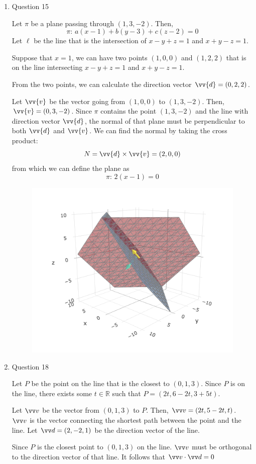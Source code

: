 \documentclass[11pt]{article}
\def\R {{\mathbb R}}
\begin{document}
\begin{enumerate}
    \newpage
    
    \item Question 15
    
    Let $\pi$ be a plane passing through $(1,3,-2)$. Then,
    $$
    \pi:\, a(x-1)+b(y-3)+c(z-2) = 0
    $$
    Let $\ell$ be the line that is the intersection of $x-y+z=1$ and $x+y-z=1$.
    
    Suppose that $x=1$, we can have two points $(1,0,0)$ and $(1,2,2)$ that is on the line intersecting $x-y+z=1$ and $x+y-z=1$.
    
    From the two points, we can calculate the direction vector $\vv{d} = (0,2,2)$.
    
    Let $\vv{v}$ be the vector going from $(1,0,0)$ to $(1,3,-2)$. Then, $\vv{v}=(0,3,-2)$. Since $\pi$ contains the point $(1,3,-2)$ and the line with direction vector $\vv{d}$, the normal of that plane must be perpendicular to both $\vv{d}$ and $\vv{v}$. We can find the normal by taking the cross product:
    $$
    N = \vv{d} \times \vv{v} = (2,0,0)
    $$
    from which we can define the plane as
    $$
    \pi:\, 2(x-1) = 0
    $$
    
    \begin{figure}[h!]
        \centering
        \includegraphics[width=0.5\linewidth]{figures/p2q15.png}
    \end{figure}
    
    \item Question 18
    
    Let $P$ be the point on the line that is the closest to $(0,1,3)$. Since $P$ is on the line, there exists some $t \in \R$ such that $P=(2t,6-2t,3+5t)$.
    
    Let $\vv v$ be the vector from $(0,1,3)$ to $P$. Then, $\vv v = (2t,5-2t,t)$. $\vv v$ is the vector connecting the shortest path between the point and the line. Let $\vv d = (2,-2,1)$ be the direction vector of the line.
    
    Since $P$ is the closest point to $(0,1,3)$ on the line. $\vv v$ must be orthogonal to the direction vector of that line. It follows that $\vv v \cdot \vv d = 0$
    

\end{enumerate}
\end{document}
